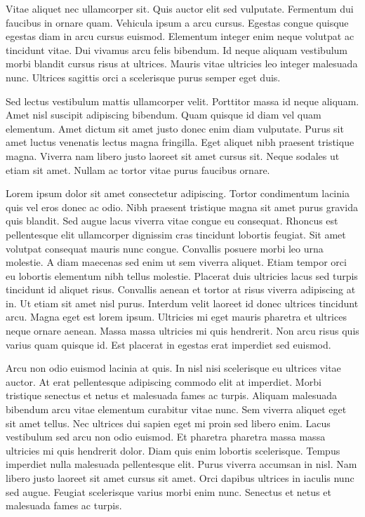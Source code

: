 \documentclass[conference]{IEEEtran}
\begin{document}
Vitae aliquet nec ullamcorper sit. Quis auctor elit sed vulputate. Fermentum dui faucibus in ornare quam. Vehicula ipsum a arcu cursus. Egestas congue quisque egestas diam in arcu cursus euismod. Elementum integer enim neque volutpat ac tincidunt vitae. Dui vivamus arcu felis bibendum. Id neque aliquam vestibulum morbi blandit cursus risus at ultrices. Mauris vitae ultricies leo integer malesuada nunc. Ultrices sagittis orci a scelerisque purus semper eget duis.

Sed lectus vestibulum mattis ullamcorper velit. Porttitor massa id neque aliquam. Amet nisl suscipit adipiscing bibendum. Quam quisque id diam vel quam elementum. Amet dictum sit amet justo donec enim diam vulputate. Purus sit amet luctus venenatis lectus magna fringilla. Eget aliquet nibh praesent tristique magna. Viverra nam libero justo laoreet sit amet cursus sit. Neque sodales ut etiam sit amet. Nullam ac tortor vitae purus faucibus ornare.

Lorem ipsum dolor sit amet consectetur adipiscing. Tortor condimentum lacinia quis vel eros donec ac odio. Nibh praesent tristique magna sit amet purus gravida quis blandit. Sed augue lacus viverra vitae congue eu consequat. Rhoncus est pellentesque elit ullamcorper dignissim cras tincidunt lobortis feugiat. Sit amet volutpat consequat mauris nunc congue. Convallis posuere morbi leo urna molestie. A diam maecenas sed enim ut sem viverra aliquet. Etiam tempor orci eu lobortis elementum nibh tellus molestie. Placerat duis ultricies lacus sed turpis tincidunt id aliquet risus. Convallis aenean et tortor at risus viverra adipiscing at in. Ut etiam sit amet nisl purus. Interdum velit laoreet id donec ultrices tincidunt arcu. Magna eget est lorem ipsum. Ultricies mi eget mauris pharetra et ultrices neque ornare aenean. Massa massa ultricies mi quis hendrerit. Non arcu risus quis varius quam quisque id. Est placerat in egestas erat imperdiet sed euismod.

Arcu non odio euismod lacinia at quis. In nisl nisi scelerisque eu ultrices vitae auctor. At erat pellentesque adipiscing commodo elit at imperdiet. Morbi tristique senectus et netus et malesuada fames ac turpis. Aliquam malesuada bibendum arcu vitae elementum curabitur vitae nunc. Sem viverra aliquet eget sit amet tellus. Nec ultrices dui sapien eget mi proin sed libero enim. Lacus vestibulum sed arcu non odio euismod. Et pharetra pharetra massa massa ultricies mi quis hendrerit dolor. Diam quis enim lobortis scelerisque. Tempus imperdiet nulla malesuada pellentesque elit. Purus viverra accumsan in nisl. Nam libero justo laoreet sit amet cursus sit amet. Orci dapibus ultrices in iaculis nunc sed augue. Feugiat scelerisque varius morbi enim nunc. Senectus et netus et malesuada fames ac turpis.
\end{document}
